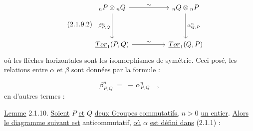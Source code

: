 \begin{equation}\tag{2.1.9.2}
\begin{tikzcd}[column sep=huge, row sep=huge]
{}_nP \otimes {}_nQ \arrow[r, "\sim"] \arrow[d, "{\beta^n_{P,Q}}"'] & {}_nQ \otimes {}_nP \arrow[d, "{\alpha^n_{Q,P}}"] \\
\underline{Tor}_1(P,Q) \arrow[r, "\sim"] & \underline{Tor}_1(Q,P)
\end{tikzcd}
\end{equation}
où les flèches horizontales sont les isomorphismes de symétrie. Ceci posé, les relations entre $\alpha$ et $\beta$ sont données par la formule :

\begin{equation}\tag{2.1.9.3}
\beta^n_{P,Q} \;=\; - \,\alpha^n_{P,Q} \quad ,
\end{equation}
en d'autres termes :

\underline{Lemme} 2.1.10. \underline{Soient} $P$ \underline{et} $Q$ \underline{deux Groupes commutatifs,} $n > 0$ \underline{un entier}. \underline{Alors le diagramme suivant est} anticommutatif, \underline{où} $\alpha$ \underline{est défini dans} (2.1.1) :

